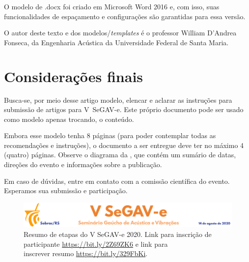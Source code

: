 \documentclass[12pt, a4paper, twoside, twocolumn]{article}
\begin{document}
O modelo de .docx foi criado em Microsoft Word 2016 e, com isso, suas funcionalidades de espaçamento e configurações são garantidas para essa versão.

O autor deste texto e dos modelos/\textit{templates} é o professor William D'Andrea Fonseca, da Engenharia Acústica da Universidade Federal de Santa Maria. 

\section{Considerações finais}

Busca-se, por meio desse artigo modelo, elencar e aclarar as instruções para submissão de artigos para V~SeGAV-e. Este próprio documento pode ser usado como modelo apenas trocando, o conteúdo.

Embora esse modelo tenha 8 páginas (para poder contemplar todas as recomendações e instruções), o documento a ser entregue deve ter no máximo 4 (quatro) páginas.
%
Observe o diagrama da , que contém um sumário de datas, direções do evento e informações sobre a publicação.

Em caso de dúvidas, entre em contato com a comissão científica do evento. Esperamos sua submissão e participação.

\vspace{+2mm}
\begin{figure}[H]
	\centering 
        \includegraphics[width=0.98\linewidth,page=3]{segav.pdf}
        \caption{Resumo de etapas do V SeGAV-e 2020. Link para inscrição de participante \url{https://bit.ly/2Z69ZK6} e link para\\ inscrever resumo \url{https://bit.ly/329FbKi}.}
	\label{fig:reusmao}%
\end{figure}

%

\pagebreak
\renewcommand{\refname}{Referências} 
 
{\fontrefs }
\end{document}

